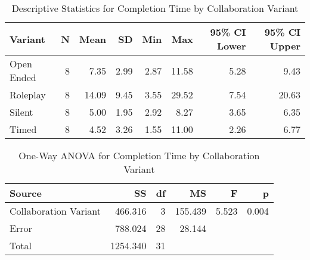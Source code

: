 
\begin{table}[htbp]
\centering
\caption{Descriptive Statistics for Completion Time by Collaboration Variant}
\label{tab:completion_time_by_variant}
\begin{tabular}{lrrrrrrr}
\toprule
Variant & N & Mean & SD & Min & Max & 95\% CI Lower & 95\% CI Upper \\
\midrule
Open Ended & 8 & 7.35 & 2.99 & 2.87 & 11.58 & 5.28 & 9.43 \\
Roleplay & 8 & 14.09 & 9.45 & 3.55 & 29.52 & 7.54 & 20.63 \\
Silent & 8 & 5.00 & 1.95 & 2.92 & 8.27 & 3.65 & 6.35 \\
Timed & 8 & 4.52 & 3.26 & 1.55 & 11.00 & 2.26 & 6.77 \\
\bottomrule
\end{tabular}
\end{table}

\begin{table}[htbp]
\centering
\caption{One-Way ANOVA for Completion Time by Collaboration Variant}
\label{tab:anova_completion_time_variant}
\begin{tabular}{lrrrrr}
\toprule
Source & SS & df & MS & F & p \\
\midrule
Collaboration Variant & 466.316 & 3 & 155.439 & 5.523 & 0.004 \\
Error & 788.024 & 28 & 28.144 &  &  \\
Total & 1254.340 & 31 &  &  &  \\
\bottomrule
\end{tabular}
\end{table}

